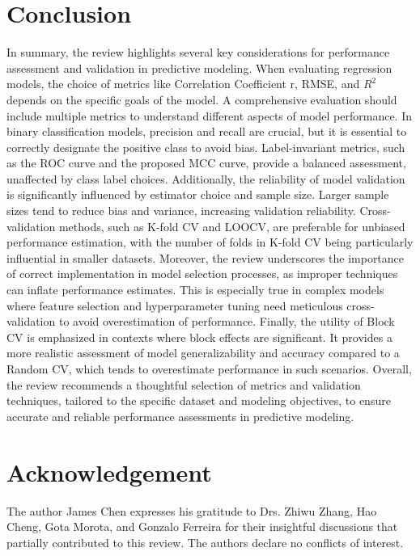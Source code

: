 \section{Conclusion}

In summary, the review highlights several key considerations for performance assessment and validation in predictive modeling. When evaluating regression models, the choice of metrics like Correlation Coefficient r, RMSE, and $R^2$ depends on the specific goals of the model. A comprehensive evaluation should include multiple metrics to understand different aspects of model performance. In binary classification models, precision and recall are crucial, but it is essential to correctly designate the positive class to avoid bias. Label-invariant metrics, such as the ROC curve and the proposed MCC curve, provide a balanced assessment, unaffected by class label choices.
Additionally, the reliability of model validation is significantly influenced by estimator choice and sample size. Larger sample sizes tend to reduce bias and variance, increasing validation reliability. Cross-validation methods, such as K-fold CV and LOOCV, are preferable for unbiased performance estimation, with the number of folds in K-fold CV being particularly influential in smaller datasets. Moreover, the review underscores the importance of correct implementation in model selection processes, as improper techniques can inflate performance estimates. This is especially true in complex models where feature selection and hyperparameter tuning need meticulous cross-validation to avoid overestimation of performance. Finally, the utility of Block CV is emphasized in contexts where block effects are significant. It provides a more realistic assessment of model generalizability and accuracy compared to a Random CV, which tends to overestimate performance in such scenarios.
Overall, the review recommends a thoughtful selection of metrics and validation techniques, tailored to the specific dataset and modeling objectives, to ensure accurate and reliable performance assessments in predictive modeling.

\section{Acknowledgement}
The author James Chen expresses his gratitude to Drs. Zhiwu Zhang, Hao Cheng, Gota Morota, and Gonzalo Ferreira for their insightful discussions that partially contributed to this review. The authors declare no conflicts of interest.